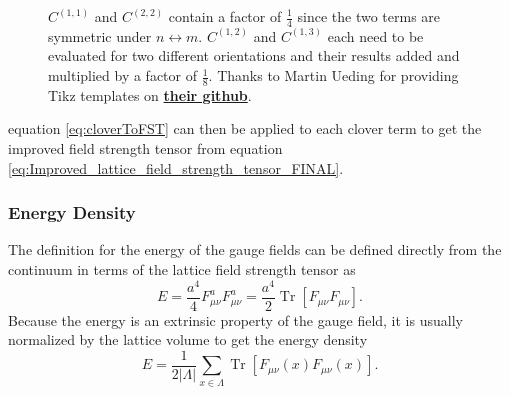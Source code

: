 \documentclass[a4paper,10pt]{article}
\begin{document}
\begin{figure}[H]
\begin{subfigure}[b]{0.4\textwidth}
{
}
\end{subfigure}
\caption{$C^{(1,1)}$ and $C^{(2,2)}$ contain a factor of $\frac{1}{4}$ since the two terms are symmetric under $n\leftrightarrow m$. $C^{(1,2)}$ and $C^{(1,3)}$ each need to be evaluated for two different orientations and their results added and multiplied by a factor of $\frac{1}{8}$. Thanks to Martin Ueding for providing Tikz templates on \href{https://github.com/HISKP-LQCD/lqcd-tikz-graphics}{\textbf{their github}}.}\label{figure:Clovers}
\end{figure}
equation \eqref{eq:cloverToFST} can then be applied to each clover term to get the improved field strength tensor from equation \eqref{eq:Improved_lattice_field_strength_tensor_FINAL}.
\subsubsection{Energy Density}
The definition for the energy of the gauge fields can be defined directly from the continuum in terms of the lattice field strength tensor as
\begin{equation}
E=\frac{a^4}{4} F_{\mu \nu}^{a} F_{\mu \nu}^{a} = \frac{a^4}{2}\operatorname{Tr}\left[ F_{\mu \nu} F_{\mu \nu}\right].
\end{equation}
Because the energy is an extrinsic property of the gauge field, it is usually normalized by the lattice volume to get the energy density
\begin{equation}
E = \frac{1}{2\left| \Lambda \right|}\sum\limits_{x\in\Lambda}\operatorname{Tr}\left[ F_{\mu \nu}(x) F_{\mu \nu}(x)\right].
\end{equation}
\end{document}
